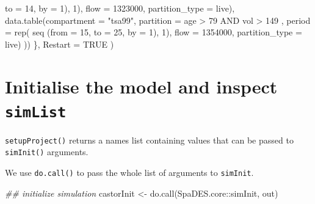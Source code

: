 \documentclass[
  letterpaper,
  DIV=11,
  numbers=noendperiod]{scrreprt}
\newenvironment{Shaded}{\begin{snugshade}}{\end{snugshade}}
\newcommand{\AttributeTok}[1]{\textcolor[rgb]{0.40,0.45,0.13}{#1}}
\newcommand{\ConstantTok}[1]{\textcolor[rgb]{0.56,0.35,0.01}{#1}}
\newcommand{\DecValTok}[1]{\textcolor[rgb]{0.68,0.00,0.00}{#1}}
\newcommand{\DocumentationTok}[1]{\textcolor[rgb]{0.37,0.37,0.37}{\textit{#1}}}
\newcommand{\FunctionTok}[1]{\textcolor[rgb]{0.28,0.35,0.67}{#1}}
\newcommand{\NormalTok}[1]{\textcolor[rgb]{0.00,0.23,0.31}{#1}}
\newcommand{\OtherTok}[1]{\textcolor[rgb]{0.00,0.23,0.31}{#1}}
\newcommand{\SpecialCharTok}[1]{\textcolor[rgb]{0.37,0.37,0.37}{#1}}
\newcommand{\StringTok}[1]{\textcolor[rgb]{0.13,0.47,0.30}{#1}}
\begin{document}
\begin{Shaded}
\begin{Highlighting}[]
                                                 \AttributeTok{to =} \DecValTok{14}\NormalTok{, }
                                                 \AttributeTok{by =} \DecValTok{1}\NormalTok{),}
                                            \DecValTok{1}\NormalTok{), }
                              \AttributeTok{flow =} \DecValTok{1323000}\NormalTok{, }
                              \AttributeTok{partition\_type =} \StringTok{\textquotesingle{}live\textquotesingle{}}\NormalTok{),}
                   \FunctionTok{data.table}\NormalTok{(}\AttributeTok{compartment =} \StringTok{"tsa99"}\NormalTok{,}
                              \AttributeTok{partition =} \StringTok{\textquotesingle{} age \textgreater{} 79 AND vol \textgreater{} 149 \textquotesingle{}}\NormalTok{, }
                              \AttributeTok{period =} \FunctionTok{rep}\NormalTok{( }\FunctionTok{seq}\NormalTok{ (}\AttributeTok{from =} \DecValTok{15}\NormalTok{,}
                                                 \AttributeTok{to =} \DecValTok{25}\NormalTok{, }
                                                 \AttributeTok{by =} \DecValTok{1}\NormalTok{),}
                                            \DecValTok{1}\NormalTok{), }
                              \AttributeTok{flow =} \DecValTok{1354000}\NormalTok{, }
                              \AttributeTok{partition\_type =} \StringTok{\textquotesingle{}live\textquotesingle{}}\NormalTok{)  }
\NormalTok{    ))}
\NormalTok{  \},}
  \AttributeTok{Restart =} \ConstantTok{TRUE}
\NormalTok{)}
\end{Highlighting}
\end{Shaded}

\section{\texorpdfstring{Initialise the model and inspect
\texttt{simList}}{Initialise the model and inspect simList}}\label{initialise-the-model-and-inspect-simlist}

\texttt{setupProject()} returns a names list containing values that can
be passed to \texttt{simInit()} arguments.

We use \texttt{do.call()} to pass the whole list of arguments to
\texttt{simInit}.

\begin{Shaded}
\begin{Highlighting}[]
\DocumentationTok{\#\# initialize simulation}
\NormalTok{castorInit }\OtherTok{\textless{}{-}} \FunctionTok{do.call}\NormalTok{(SpaDES.core}\SpecialCharTok{::}\NormalTok{simInit, out)}
\end{Highlighting}
\end{Shaded}
\end{document}
